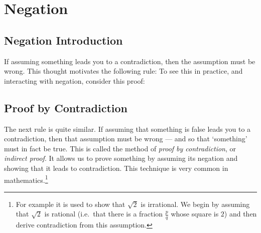 \section{Negation}

\subsection{Negation Introduction}
If assuming something leads you to a contradiction, then the assumption must be wrong. This thought motivates the following rule:
To see this in practice, and interacting with negation, consider this proof:
	\begin{pf}
		\open
		\close
	\end{pf}


\subsection{Proof by Contradiction} %

The next rule is quite similar. If assuming that something is false leads you to a contradiction, then that assumption must be wrong --- and so that `something' must in fact be true.
This is called the method of \emph{proof by contradiction}, or \emph{indirect proof}. It allows us to prove something by assuming its negation and showing that it leads to contradiction. This technique is very common in mathematics.\footnote{
For example it is used to show that $\sqrt{2}$ is irrational.  We begin by assuming that $\sqrt{2}$ is rational (i.e.~that there is a fraction $\frac{p}{q}$ whose square is $2$) and then derive contradiction from this assumption.
}

